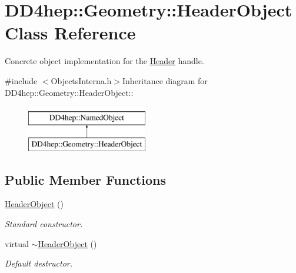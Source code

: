 \hypertarget{class_d_d4hep_1_1_geometry_1_1_header_object}{
\section{DD4hep::Geometry::HeaderObject Class Reference}
\label{class_d_d4hep_1_1_geometry_1_1_header_object}
}


Concrete object implementation for the \hyperlink{class_d_d4hep_1_1_geometry_1_1_header}{Header} handle.  


{\ttfamily \#include $<$ObjectsInterna.h$>$}Inheritance diagram for DD4hep::Geometry::HeaderObject::\begin{figure}[H]
\begin{center}
\leavevmode
\includegraphics[height=2cm]{class_d_d4hep_1_1_geometry_1_1_header_object}
\end{center}
\end{figure}
\subsection*{Public Member Functions}
\begin{DoxyCompactItemize}
\item 
\hyperlink{class_d_d4hep_1_1_geometry_1_1_header_object_a5eed0824bd2e8fc9bdc3a83741bea1d0}{HeaderObject} ()
\begin{DoxyCompactList}\small\item\em Standard constructor. \item\end{DoxyCompactList}\item 
virtual \hyperlink{class_d_d4hep_1_1_geometry_1_1_header_object_a85f2f362b11a0ebb206e118489a3810f}{$\sim$HeaderObject} ()
\begin{DoxyCompactList}\small\item\em Default destructor. \item\end{DoxyCompactList}\end{DoxyCompactItemize}
